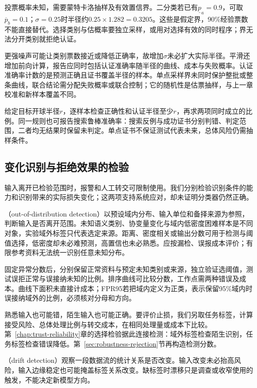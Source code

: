 投票概率未知，需要蒙特卡洛抽样及有效置信界。二分类若已有$\underline p_a=0.9$，可取$\overline p_b=0.1$；$\sigma=0.25$时半径约$0.25\times1.282=0.3205$。这些是假定界，90\%经验票数不能直接替代。选择类别与估概率要独立采样，或用对选择有效的同时程序；界无法分开类别就拒绝认证。

更强噪声可能让类别票数接近或降低正确率，故增加$\sigma$未必扩大实际半径。平滑还增加前向计算，报告应同时包括认证准确率随半径的曲线、成本与失败概率。认证准确率计数的是预测正确且证书覆盖半径的样本。单点采样界未同时保护整批或整条曲线，联合结论需分配失败概率或联合控制；它的随机性是估票抽样，与上一章校准和新样本覆盖不同。

给定目标开球半径$r$，逐样本检查正确性和认证半径至少$r$，再求两项同时成立的比例。同一规则也可报告搜索鲁棒准确率：搜索反例与成功证书分别判错、判定范围，二者均无结果时保留未判定。单点证书不保证测试代表未来，总体风险仍需抽样条件。

\subsection{变化识别与拒绝效果的检验}
\label{sec:robustness-monitor-test}

输入离开已检验范围时，报警和人工转交可限制使用。我们分别检验识别条件的能力和识别带来的实际损失变化；这两项支持系统应对，却未证明分类器仍然正确。

（out-of-distribution detection）以预设域内分布、输入单位和备择来源为参照，判断输入是否离开范围。未知语义类别、协变量变化与域内低密度困难样本是不同对象，实验域外标签只代表选定来源。距离、密度相关或输出分数可用于检测与阈值选择，低密度却未必难预测，高置信也未必熟悉。应按漏检、误报成本评价；有限参考资料无法统一识别任意未知分布。

固定异常分数后，分别保留正常资料与预定未知类别或来源，独立验证选阈值，测试误拒正常与误接纳未知的比例。排序曲线可比较分数，工作点需两种错误及成本。曲线下面积未直接计成本；FPR95若把域内定义为正类，表示保留95\%域内时误接纳域外的比例，必须核对分母和方向。

熟悉输入也可能错，陌生输入也可能正确。要评价止损，我们另取任务标签，计算接受风险、总体处理比例与转交成本，在相同处理量或成本下比较。第~\ref{chap:trust-reliability}章的选择检验据此连接检测：域外标签检查陌生识别，任务标签检查错误降低。第~\ref{sec:robustness-rejection}节再构造检测分数。

（drift detection）观察一段数据流的统计关系是否改变。输入改变未必抬高风险，输入边缘稳定也可能掩盖标签关系改变。缺标签时漂移只是调查或收窄使用的触发，不能决定新模型方向。

